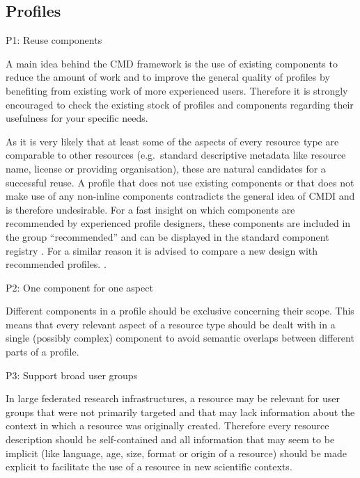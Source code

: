 \subsection{Profiles}\label{profiles}

P1: Reuse components

 

A main idea behind the CMD framework is the use of existing components to reduce the amount of work and to improve the general quality of profiles by benefiting from existing work of more experienced users. Therefore it is strongly encouraged to check the existing stock of profiles and components regarding their usefulness for your specific needs.

As it is very likely that at least some of the aspects of every resource type are comparable to other resources (e.g.~standard descriptive metadata like resource name, license or providing organisation), these are natural candidates for a successful reuse. A profile that does not use existing components or that does not make use of any non-inline components contradicts the general idea of CMDI and is therefore undesirable. For a fast insight on which components are recommended by experienced profile designers, these components are included in the
group ``recommended'' and can be displayed in the standard component registry . For a similar reason it is advised to compare a new design with recommended profiles. .

P2: One component for one aspect


Different components in a profile should be exclusive concerning their scope. This means that every relevant aspect of a resource type should be dealt with in a single (possibly complex) component to avoid semantic overlaps between different parts of a profile.

P3: Support broad user groups


In large federated research infrastructures, a resource may be relevant for user groups that were not primarily targeted and that may lack information about the context in which a resource was originally created. Therefore every resource description should be self-contained and all information that may seem to be implicit (like language, age, size, format or origin of a resource) should be made explicit to facilitate the use of a resource in new scientific contexts.

